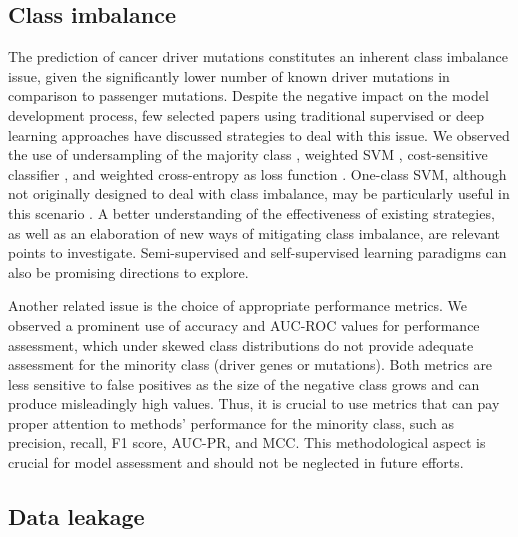 \subsection{Class imbalance}

The prediction of cancer driver mutations constitutes an inherent class imbalance issue, given the significantly lower number of known driver mutations in comparison to passenger mutations.
Despite the negative impact on the model development process, few selected papers using traditional supervised or deep learning approaches have discussed strategies to deal with this issue. We observed the use of undersampling of the majority class \cite{Capriotti2011, Tan2012, Gnad2015, Luo2019, Cutigi2020, Gumpinger2020}, weighted SVM \cite{Mao2013}, cost-sensitive classifier \cite{U2014}, and weighted cross-entropy as loss function \cite{Schulte-Sasse2019}. One-class SVM, although not originally designed to deal with class imbalance, may be particularly useful in this scenario \cite{Collier2019, Nulsen2021}. A better understanding of the effectiveness of existing strategies, as well as an elaboration of new ways of mitigating class imbalance, are relevant points to investigate. Semi-supervised and self-supervised learning paradigms can also be promising directions to explore.

Another related issue is the choice of appropriate performance metrics. We observed a prominent use of accuracy and AUC-ROC values for performance assessment, which under skewed class distributions do not provide adequate assessment for the minority class (\ie driver genes or mutations). Both metrics are less sensitive to false positives as the size of the negative class grows and can produce misleadingly high values. 
Thus, it is crucial to use metrics that can pay proper attention to methods' performance for the minority class, such as precision, recall, F1 score, AUC-PR, and MCC. This methodological aspect is crucial for model assessment and should not be neglected in future efforts.

\subsection{Data leakage}

